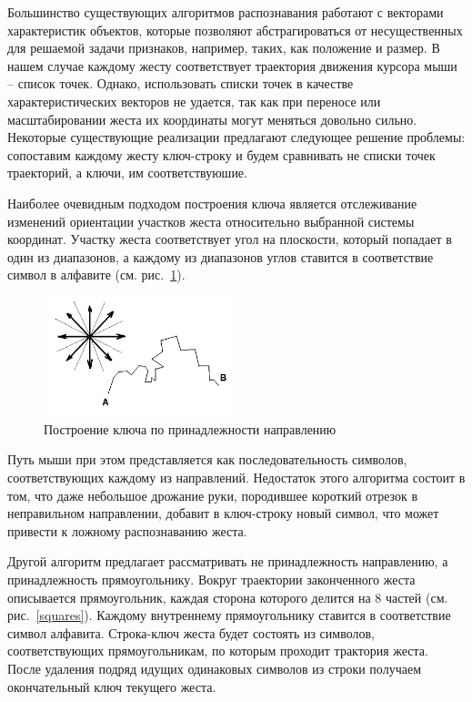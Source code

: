 \documentclass[a5paper]{article}
\begin{document}
Большинство существующих алгоритмов распознавания работают с векторами характеристик объектов, которые позволяют абстрагироваться
от несущественных для решаемой задачи признаков, например, таких, как положение и размер. 
В нашем случае каждому жесту соответствует траектория движения курсора мыши -- список точек. Однако, использовать списки точек в качестве
характеристических векторов не удается, так как при переносе или масштабировании жеста их координаты могут меняться довольно сильно.
Некоторые существующие реализации предлагают следующее решение проблемы: сопоставим каждому жесту ключ-строку и будем сравнивать не 
списки точек траекторий, а ключи, им соответствуюшие.

Наиболее очевидным подходом построения ключа является отслеживание изменений ориентации участков жеста относительно выбранной системы координат. 
Участку жеста соответствует угол на плоскости, который попадает в один из диапазонов, а каждому из диапазонов 
углов ставится в соответствие символ в алфавите (см. рис.~\ref{chaos}). 

\begin{figure} [ht]
  \begin{center}
    \includegraphics[width=0.5\textwidth, bb=0 0 544 390]{02-chaos.png}
    \caption{Построение ключа по принадлежности направлению}
    \label{chaos}
  \end{center}
\end{figure}

Путь мыши при этом представляется как последовательность символов, соответствующих каждому из направлений. Недостаток этого алгоритма состоит 
в том, что даже небольшое дрожание руки, породившее короткий отрезок в неправильном направлении, добавит в ключ-строку новый символ, что
может привести к ложному распознаванию жеста.

Другой алгоритм предлагает рассматривать не принадлежность направлению, а принадлежность прямоугольнику. Вокруг траектории законченного жеста 
описывается прямоугольник, каждая сторона которого делится на 8 частей (см. рис.~\ref{squares}). Каждому внутреннему 
прямоугольнику ставится в соответствие символ алфавита. Строка-ключ жеста будет состоять из символов, соответствующих прямоугольникам, по
которым проходит трактория жеста. После удаления подряд идущих одинаковых символов из строки получаем окончательный ключ текущего жеста. 
\end{document}
